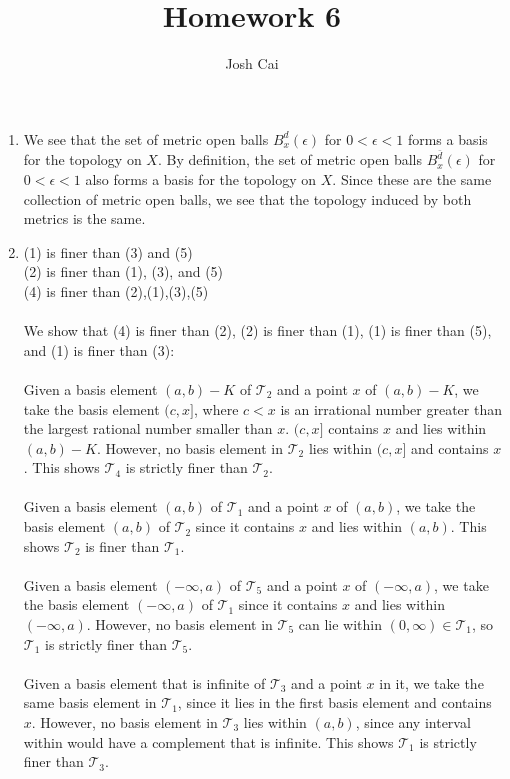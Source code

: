 \documentclass{article}
\begin{document}
\title{Homework 6}
\author{Josh Cai}

\maketitle


\begin{enumerate}
\item
We see that the set of metric open balls $B_x^d(\epsilon)$ for $0<\epsilon<1$ forms a basis for the topology on $X$. By definition, the set of metric open balls $B_x^{\bar d}(\epsilon)$ for $0<\epsilon<1$ also forms a basis for the topology on $X$. Since these are the same collection of metric open balls, we see that the topology induced by both metrics is the same.

\item
(1) is finer than (3) and (5)
\\(2) is finer than (1), (3), and (5)
\\(4) is finer than (2),(1),(3),(5)
\\\\We show that (4) is finer than (2), (2) is finer than (1), (1) is finer than (5), and (1) is finer than (3):
\\\\Given a basis element $(a,b)-K$ of $\mathcal{T}_2$ and a point $x$ of $(a,b)-K$, we take the basis element $(c,x]$, where $c<x$ is an irrational number greater than the largest rational number smaller than $x$. $(c,x]$ contains $x$ and lies within $(a,b)-K$. However, no basis element in $\mathcal{T}_2$ lies within $(c,x]$ and contains $x$. This shows $\mathcal{T}_4$ is strictly finer than $\mathcal{T}_2$.
\\\\Given a basis element $(a,b)$ of $\mathcal{T}_1$ and a point $x$ of $(a,b)$, we take the basis element $(a,b)$ of $\mathcal{T}_2$ since it contains $x$ and lies within $(a,b)$. This shows $\mathcal{T}_2$ is finer than $\mathcal{T}_1$.
\\\\Given a basis element $(-\infty,a)$ of $\mathcal{T}_5$ and a point $x$ of $(-\infty,a)$, we take the basis element $(-\infty,a)$ of $\mathcal{T}_1$ since it contains $x$ and lies within $(-\infty,a)$. However, no basis element in $\mathcal{T}_5$ can lie within $(0,\infty) \in \mathcal{T}_1$, so $\mathcal{T}_1$ is strictly finer than $\mathcal{T}_5$.
\\\\Given a basis element that is infinite of $\mathcal{T}_3$ and a point $x$ in it, we take the same basis element in $\mathcal{T}_1$, since it lies in the first basis element and contains $x$. However, no basis element in $\mathcal{T}_3$ lies within $(a,b)$, since any interval within would have a complement that is infinite. This shows $\mathcal{T}_1$ is strictly finer than $\mathcal{T}_3$.


\end{enumerate}
\end{document}
